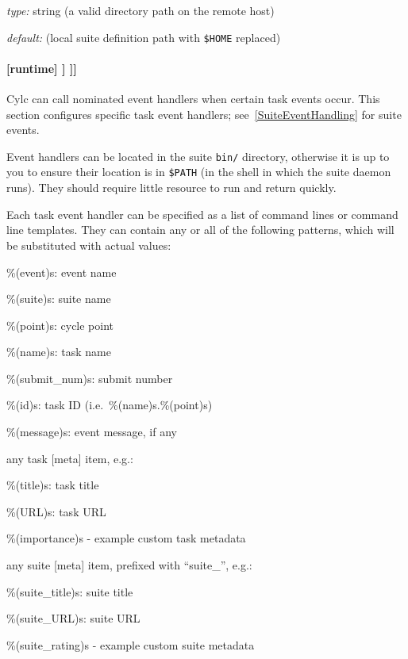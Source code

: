 \begin{myitemize}
\item {\em type:} string (a valid directory path on the remote host)
\item {\em default:} (local suite definition path with \lstinline=$HOME=
    replaced)
\end{myitemize}


\paragraph[{[[[}events{]]]}]{[runtime] \textrightarrow [[\_\_NAME\_\_]] \textrightarrow [[[events]]]}
\label{TaskEventHandling}

Cylc can call nominated event handlers when certain task events occur. This
section configures specific task event handlers; see~\ref{SuiteEventHandling}
for suite events.

Event handlers can be located in the suite \lstinline=bin/= directory,
otherwise it is up to you to ensure their location is in \lstinline=$PATH= (in
the shell in which the suite daemon runs). They should require little resource
to run and return quickly.

Each task event handler can be specified as a list of command lines or command
line templates. They can contain any or all of the following patterns, which
will be substituted with actual values:
\begin{myitemize}
    \item \%(event)s: event name
    \item \%(suite)s: suite name
    \item \%(point)s: cycle point
    \item \%(name)s: task name
    \item \%(submit\_num)s: submit number
    \item \%(id)s: task ID (i.e.\ \%(name)s.\%(point)s)
    \item \%(message)s: event message, if any
    \item any task [meta] item, e.g.:
    \begin{myitemize}
      \item \%(title)s: task title
      \item \%(URL)s: task URL
      \item \%(importance)s - example custom task metadata
    \end{myitemize}
    \item any suite [meta] item, prefixed with ``suite\_'', e.g.:
    \begin{myitemize}
      \item \%(suite\_title)s: suite title
      \item \%(suite\_URL)s: suite URL
      \item \%(suite\_rating)s - example custom suite metadata
    \end{myitemize}
\end{myitemize}

